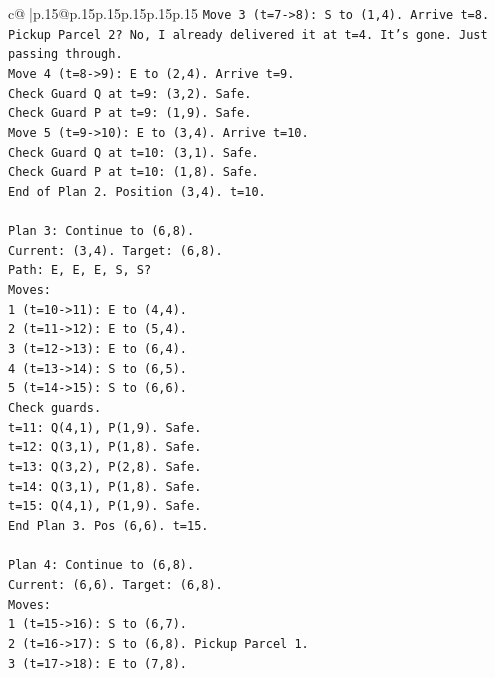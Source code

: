 \documentclass{article}
\begin{document}
{\begin{supertabular}{c@{$\;$}|p{.15\linewidth}@{}p{.15\linewidth}p{.15\linewidth}p{.15\linewidth}p{.15\linewidth}p{.15\linewidth}}
{{{\texttt{Move 3 (t=7{-}>8): S to (1,4). Arrive t=8. Pickup Parcel 2? No, I already delivered it at t=4. It's gone. Just passing through.} \\
\texttt{Move 4 (t=8{-}>9): E to (2,4). Arrive t=9.} \\
\texttt{Check Guard Q at t=9: (3,2). Safe.} \\
\texttt{Check Guard P at t=9: (1,9). Safe.} \\
\texttt{Move 5 (t=9{-}>10): E to (3,4). Arrive t=10.} \\
\texttt{Check Guard Q at t=10: (3,1). Safe.} \\
\texttt{Check Guard P at t=10: (1,8). Safe.} \\
\texttt{End of Plan 2. Position (3,4). t=10.} \\
\\ 
\texttt{Plan 3: Continue to (6,8).} \\
\texttt{Current: (3,4). Target: (6,8).} \\
\texttt{Path: E, E, E, S, S?} \\
\texttt{Moves:} \\
\texttt{1 (t=10{-}>11): E to (4,4).} \\
\texttt{2 (t=11{-}>12): E to (5,4).} \\
\texttt{3 (t=12{-}>13): E to (6,4).} \\
\texttt{4 (t=13{-}>14): S to (6,5).} \\
\texttt{5 (t=14{-}>15): S to (6,6).} \\
\texttt{Check guards.} \\
\texttt{t=11: Q(4,1), P(1,9). Safe.} \\
\texttt{t=12: Q(3,1), P(1,8). Safe.} \\
\texttt{t=13: Q(3,2), P(2,8). Safe.} \\
\texttt{t=14: Q(3,1), P(1,8). Safe.} \\
\texttt{t=15: Q(4,1), P(1,9). Safe.} \\
\texttt{End Plan 3. Pos (6,6). t=15.} \\
\\ 
\texttt{Plan 4: Continue to (6,8).} \\
\texttt{Current: (6,6). Target: (6,8).} \\
\texttt{Moves:} \\
\texttt{1 (t=15{-}>16): S to (6,7).} \\
\texttt{2 (t=16{-}>17): S to (6,8). Pickup Parcel 1.} \\
\texttt{3 (t=17{-}>18): E to (7,8).} \\
}}}
\end{supertabular}}
\end{document}
